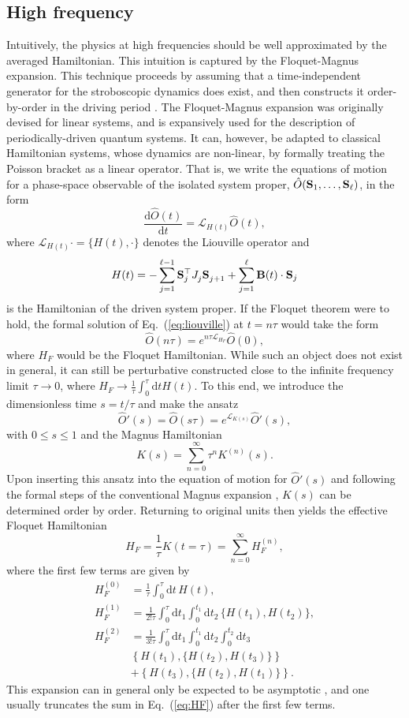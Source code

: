 \documentclass[aps,pre,twocolumn,notitlepage,floats,10pt]{revtex4-1}
\def\d{\mathrm{d}}
\def\ptop{{\vphantom\top}}
\newcommand{\be}{\begin{equation}}
\newcommand{\ee}{\end{equation}}
\newcommand{\beA}{\begin{equation}\begin{aligned}}
\newcommand{\eeA}{\end{aligned}\end{equation}}
\begin{document}
\subsection{High frequency} \label{sec:perturbations}

Intuitively, the physics at high frequencies should be well approximated by the
averaged Hamiltonian.
This intuition is captured by the Floquet-Magnus expansion.
This technique proceeds by assuming that a time-independent generator for the
stroboscopic dynamics does exist, and then constructs it order-by-order in the
driving period \cite{Blanes-Casas-Oteo-Ros}.
The Floquet-Magnus expansion was originally devised for linear systems, and is
expansively used for the description of periodically-driven quantum systems.
It can, however, be adapted to classical Hamiltonian systems, whose dynamics
are non-linear, by formally treating the Poisson bracket as a linear operator.
That is, we write the equations of motion for a phase-space observable of the
isolated system proper,
$\hat{O}({\bf S}_1,\ldots, {\bf S}_\ell)$,
in the form
\be
\frac{\d \hat{O}(t)}{\d t} = \mathcal{L}_{H(t)} \hat{O}(t),
\label{eq:liouville}
\ee
where $\mathcal{L}_{H(t)} \cdot = \{ H(t), \cdot \}$ denotes the Liouville
operator and
\be
H(t)  = -\sum_{j=1}^{\ell -1} {\bf S}_j^\top J^\ptop_j {\bf S}_{j+1}^\ptop
+ \sum_{j=1}^\ell {\bf B}(t) \cdot {\bf S}_j
\ee
is the Hamiltonian of the driven system proper.
If the Floquet theorem were to hold, the formal solution of
Eq.~(\ref{eq:liouville}) at $t=n\tau$ would take the form
\be
\hat{O}(n\tau)= e^{n\tau \mathcal{L}_{H_F}} \hat{O}(0),
\ee
where $H_F$ would be the Floquet Hamiltonian.
While such an object does not exist in general, it can still be perturbative
constructed close to the infinite frequency limit $\tau\to 0$, where 
$H_F \to \frac{1}{\tau} \int_0^\tau \d t H(t)$.
To this end, we introduce the dimensionless time $s = t/\tau$ and make the
ansatz
\be
\hat{O}'(s) = \hat{O}(s\tau) = e^{\mathcal{L}_{K(s)} } \hat{O}'(s),
\ee
with $0\leq s\leq 1$ and the Magnus Hamiltonian
\be
K(s) = \sum_{n=0}^\infty \tau^n K^{(n)}(s).
\ee
Upon inserting this ansatz into the equation of motion for $\hat{O}'(s)$ and
following the formal steps of the conventional Magnus expansion
\cite{Kitagawa-Oka-Brataas-Fu-Demler}, $K(s)$ can be determined order by order.
Returning to original units then yields the effective Floquet Hamiltonian
\be
H_F = \frac{1}{\tau} K(t=\tau) = \sum_{n=0}^\infty H_F^{(n)},
\label{eq:HF}
\ee
where the first few terms are given by
\beA
H_F^{(0)} &= \frac{1}{\tau} \int_0^\tau \d t\, H(t),\\
H_F^{(1)} &= \frac{1}{2! \tau} \int_0^\tau \d t_1 \int_0^{t_1} \d t_2\, \{ H(t_1), H(t_2) \} ,\\
H_F^{(2)} &= \frac{1}{3! \tau} \int_0^\tau \d t_1 \int_0^{t_1} \d t_2 \int_0^{t_2} \d t_3\, \\
&
\left\{ H(t_1), \{ H(t_2), H(t_3) \} \right\}\\
&
+ \left\{ H(t_3), \{ H(t_2), H(t_1) \} \right\} .
\eeA
This expansion can in general only be expected to be asymptotic
\cite{Bender-Orszag,Berry,mori-floquet-prethermal}, and one usually truncates
the sum in Eq.~(\ref{eq:HF}) after the first few terms.
\end{document}
